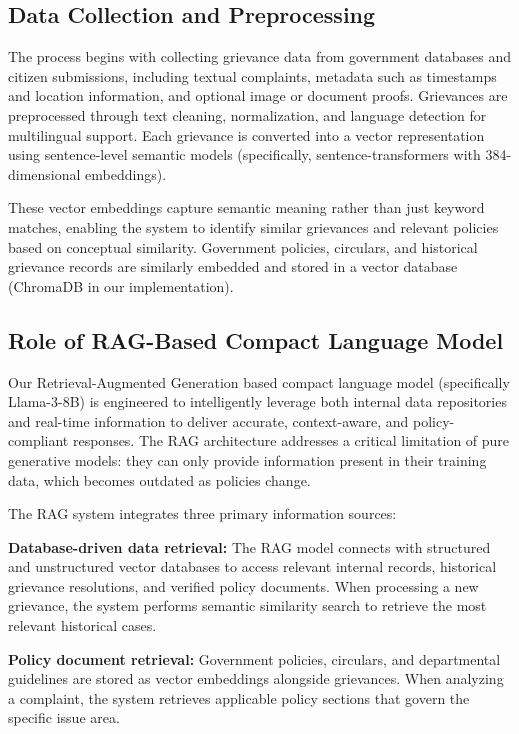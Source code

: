 \documentclass[conference]{IEEEtran}
\begin{document}
\subsection{Data Collection and Preprocessing}

The process begins with collecting grievance data from government databases and citizen submissions, including textual complaints, metadata such as timestamps and location information, and optional image or document proofs. Grievances are preprocessed through text cleaning, normalization, and language detection for multilingual support. Each grievance is converted into a vector representation using sentence-level semantic models (specifically, sentence-transformers with 384-dimensional embeddings).

These vector embeddings capture semantic meaning rather than just keyword matches, enabling the system to identify similar grievances and relevant policies based on conceptual similarity. Government policies, circulars, and historical grievance records are similarly embedded and stored in a vector database (ChromaDB in our implementation).

\subsection{Role of RAG-Based Compact Language Model}

Our Retrieval-Augmented Generation based compact language model (specifically Llama-3-8B) is engineered to intelligently leverage both internal data repositories and real-time information to deliver accurate, context-aware, and policy-compliant responses. The RAG architecture addresses a critical limitation of pure generative models: they can only provide information present in their training data, which becomes outdated as policies change.

The RAG system integrates three primary information sources:

\textbf{Database-driven data retrieval:} The RAG model connects with structured and unstructured vector databases to access relevant internal records, historical grievance resolutions, and verified policy documents. When processing a new grievance, the system performs semantic similarity search to retrieve the most relevant historical cases.

\textbf{Policy document retrieval:} Government policies, circulars, and departmental guidelines are stored as vector embeddings alongside grievances. When analyzing a complaint, the system retrieves applicable policy sections that govern the specific issue area.
\end{document}
